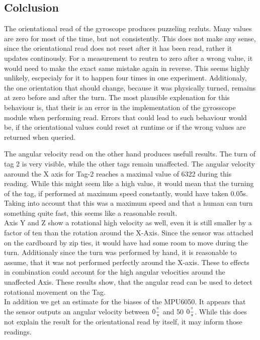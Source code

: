 \subsection{Colclusion}
\label{s:exp_3_conclusion}
The orientational read of the gyroscope produces puzzeling rezluts.
Many values are zero for most of the time, but not consistently.
This does not make any sense, since the orientational read does not reset after it has been read, rather it updates continously.
For a measurement to reutrn to zero after a wrong value, it would need to make the exact same mistake again in reverse.
This seems highly unlikely, escpecialy for it to happen four times in one experiment.
Additionaly, the one orientation that should change, because it was physically turned, remains at zero before and after the turn.
The most plausible explenation for this behaviour is, that their is an error in the implementation of the gyrosscope module when performing read.
Errors that could lead to such behaviour would be, if the orientational values could reset at runtime or if the wrong values are returned when queried.


The angular velocity read on the other hand produces usefull results.
The turn of tag 2 is very visible, while the other tags remain unaffected.
The angular velocity aaround the X axis for Tag-2 reaches a maximal value of 6322 during this reading.
While this might seem like a high value, it would mean that the turning of the tag, if performed at maximum speed constantly, would have taken 0.05s.
Taking into account that this was a maximum speed and that a human can turn something quite fast, this seems like a reasonable result.\\
Axis Y and Z show a rotational high velocity as well, even it is still smaller by a factor of ten than the rotation around the X-Axis.
Since the sensor was attached on the cardboard by zip ties, it would have had some room to move during the turn.
Additionaly since the turn was performed by hand, it is reasonable to assume, that it was not performed perfectly around the X-axis.
These to effects in combination could account for the high angular velocities around the unaffected Axis.
These results show, that the angular read can be used to detect rotational movement on the Tag. \\
In addition we get an estimate for the biases of the MPU6050.
It appears that the sensor outputs an angular velocity between $0\frac{^\circ}{s}$ and 50 $0\frac{^\circ}{s}$.
While this does not explain the result for the orientational read by itself, it may inform those readings.

